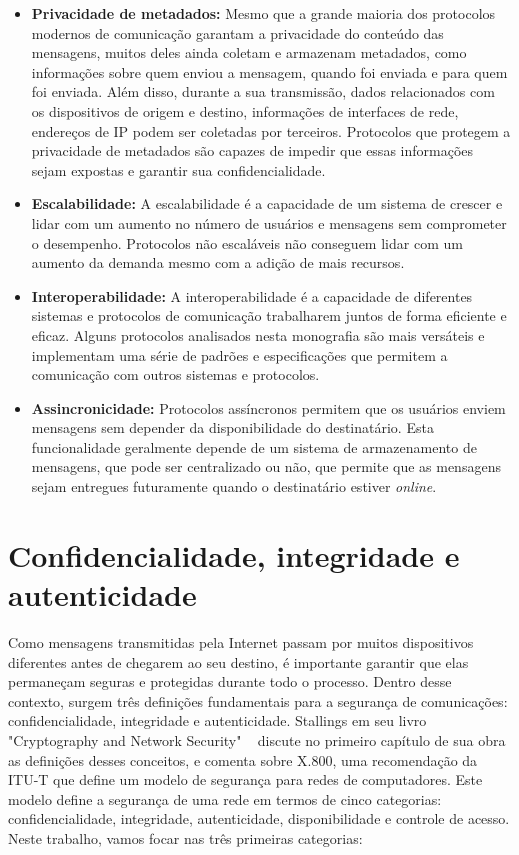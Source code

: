 \begin{itemize}
    \item \textbf{Privacidade de metadados:} Mesmo que a grande maioria dos protocolos modernos de comunicação garantam a privacidade do conteúdo das mensagens, muitos deles ainda coletam e armazenam metadados, como informações sobre quem enviou a mensagem, quando foi enviada e para quem foi enviada. Além disso, durante a sua transmissão, dados relacionados com os dispositivos de origem e destino, informações de interfaces de rede, endereços de IP podem ser coletadas por terceiros. Protocolos que protegem a privacidade de metadados são capazes de impedir que essas informações sejam expostas e garantir sua confidencialidade.
    
    \item \textbf{Escalabilidade:} A escalabilidade é a capacidade de um sistema de crescer e lidar com um aumento no número de usuários e mensagens sem comprometer o desempenho. Protocolos não escaláveis não conseguem lidar com um aumento da demanda mesmo com a adição de mais recursos.
    
    \item \textbf{Interoperabilidade:} A interoperabilidade é a capacidade de diferentes sistemas e protocolos de comunicação trabalharem juntos de forma eficiente e eficaz. Alguns protocolos analisados nesta monografia são mais versáteis e implementam uma série de padrões e especificações que permitem a comunicação com outros sistemas e protocolos.

    \item \textbf{Assincronicidade:} Protocolos assíncronos permitem que os usuários enviem mensagens sem depender da disponibilidade do destinatário. Esta funcionalidade geralmente depende de um sistema de armazenamento de mensagens, que pode ser centralizado ou não, que permite que as mensagens sejam entregues futuramente quando o destinatário estiver \textit{online}.
\end{itemize}

\section{Confidencialidade, integridade e autenticidade}

Como mensagens transmitidas pela Internet passam por muitos dispositivos diferentes antes de chegarem ao seu destino, é importante garantir que elas permaneçam seguras e protegidas durante todo o processo. Dentro desse contexto, surgem três definições fundamentais para a segurança de comunicações: confidencialidade, integridade e autenticidade. Stallings em seu livro "Cryptography and Network Security" ~\cite{Stallings2017} discute no primeiro capítulo de sua obra as definições desses conceitos, e comenta sobre X.800, uma recomendação da ITU-T que define um modelo de segurança para redes de computadores. Este modelo define a segurança de uma rede em termos de cinco categorias: confidencialidade, integridade, autenticidade, disponibilidade e controle de acesso. Neste trabalho, vamos focar nas três primeiras categorias:

